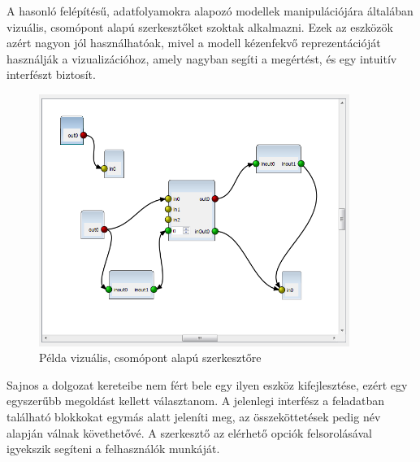 A hasonló felépítésű, adatfolyamokra alapozó modellek manipulációjára általában vizuális, csomópont alapú szerkesztőket szoktak alkalmazni.
Ezek az eszközök azért nagyon jól használhatóak, mivel a modell kézenfekvő reprezentációját használják a vizualizációhoz, amely nagyban segíti a megértést, és egy intuitív interfészt biztosít.
\begin{figure}[h]
    \centering
    \includegraphics[width=0.9\textwidth]{figures/node-based-editor-light}
    \caption[Példa vizuális, csomópont alapú szerkesztőre]{Példa vizuális, csomópont alapú szerkesztőre\footnotemark}
    \label{figure:node-based-editor}
\end{figure}

Sajnos a dolgozat kereteibe nem fért bele egy ilyen eszköz kifejlesztése, ezért egy egyszerűbb megoldást kellett választanom.
A jelenlegi interfész a feladatban található blokkokat egymás alatt jeleníti meg, az összeköttetések pedig név alapján válnak követhetővé.
A szerkesztő az elérhető opciók felsorolásával igyekszik segíteni a felhasználók munkáját.

